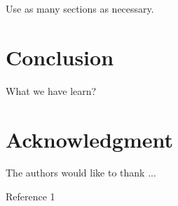 \documentclass[journal]{IEEEtran}
\begin{document}
Use as many sections as necessary.

\section{Conclusion}

What we have learn?



\section*{Acknowledgment}



The authors would like to thank ...

\begin{thebibliography}{1}
    

     Reference 1
    
\end{thebibliography}
\end{document}
